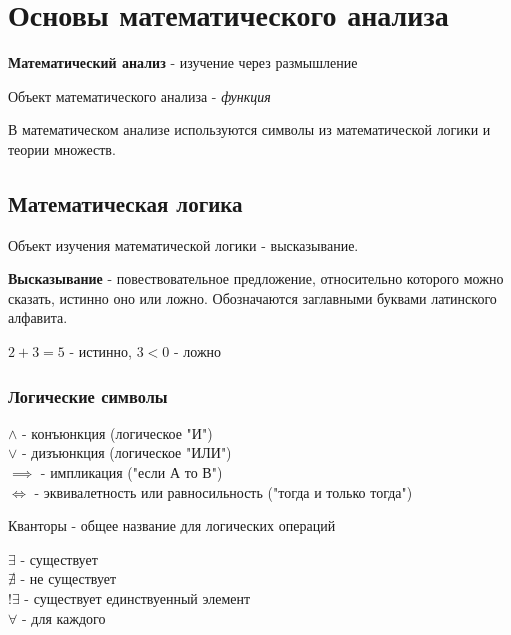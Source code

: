 \section{Основы математического анализа}

\textbf{Математический анализ} - изучение через размышление

Объект математического анализа - \textit{функция}

В математическом анализе используются символы из математической логики и теории множеств.

\subsection{Математическая логика}

Объект изучения математической логики - высказывание.

\begin{definition}
  \textbf{Высказывание} - повествовательное предложение, относительно которого можно сказать, истинно оно или ложно. Обозначаются заглавными буквами латинского алфавита.
\end{definition}
\begin{eg}
  $2+3=5$ - истинно, $3 < 0$ - ложно
\end{eg}

\subsubsection{Логические символы}

\begin{itemize}
  $\land$ - конъюнкция (логическое "И")\\
  $\lor$ - дизъюнкция (логическое "ИЛИ")\\
  $\implies$ - импликация ("если А то В")\\
  $\iff$ - эквивалетность или равносильность ("тогда и только тогда")\\
\end{itemize}

Кванторы - общее название для логических операций

\begin{itemize}
  $\exists$ - существует\\
  $\nexists$ - не существует\\
  $!\exists$ - существует единствуенный элемент\\
  $\forall$ - для каждого\\
\end{itemize}

